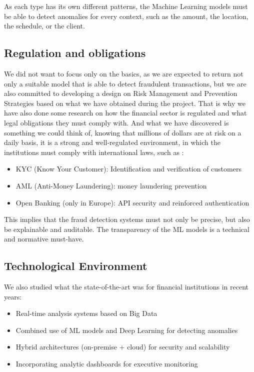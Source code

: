 \documentclass[12pt,a4paper]{report}
\begin{document}
As each type has its own different patterns, the Machine Learning models must be able to detect anomalies for every context, such as the amount, the location, the schedule, or the client.
\subsection{Regulation and obligations}
We did not want to focus only on the basics, as we are expected to return not only a suitable model that is able to detect fraudulent transactions, but we are also committed to developing a design on Risk Management and Prevention Strategies based on what we have obtained during the project. That is why we have also done some research on how the financial sector is regulated and what legal obligations they must comply with. And what we have discovered is something we could think of, knowing that millions of dollars are at risk on a daily basis, it is a strong and well-regulated environment, in which the institutions must comply with international laws, such as :
\begin{itemize}
    \item KYC (Know Your Customer): Identification and verification of customers
    \item AML (Anti-Money Laundering): money laundering prevention
    \item Open Banking (only in Europe): API security and reinforced authentication
\end{itemize}
This implies that the fraud detection systems must not only be precise, but also be explainable and auditable. The transparency of the ML models is a technical and normative must-have.

\subsection{Technological Environment}
We also studied what the state-of-the-art was for financial institutions in recent years:
\begin{itemize}
    \item Real-time analysis systems based on Big Data
    \item Combined use of ML models and Deep Learning for detecting anomalies 
    \item Hybrid architectures (on-premise + cloud) for security and scalability
    \item Incorporating analytic dashboards for executive monitoring 
\end{itemize}
\end{document}
